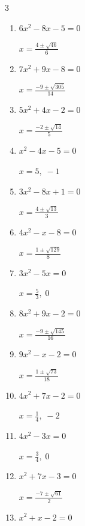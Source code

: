 \begin{multicols}{3}
\begin{enumerate}
        $\displaystyle x=\frac{-1\pm \sqrt{193}}{16}$

  \item $6x^{2}-8x-5=0$

        $\displaystyle x=\frac{4\pm \sqrt{46}}{6}$

  \item $7x^{2}+9x-8=0$

        $\displaystyle x=\frac{-9\pm \sqrt{305}}{14}$

  \item $5x^{2}+4x-2=0$

        $\displaystyle x=\frac{-2\pm \sqrt{14}}{5}$

\columnbreak %

  \item $x^{2}-4x-5=0$

        $\displaystyle x=5, \; -1$

  \item $3x^{2}-8x+1=0$

        $\displaystyle x=\frac{4\pm \sqrt{13}}{3}$

  \item $4x^{2}-x-8=0$

        $\displaystyle x=\frac{1\pm \sqrt{129}}{8}$

  \item $3x^{2}-5x=0$

        $\displaystyle x=\frac{5}{3}, \; 0$

  \item $8x^{2}+9x-2=0$

        $\displaystyle x=\frac{-9\pm \sqrt{145}}{16}$

  \item $9x^{2}-x-2=0$

        $\displaystyle x=\frac{1\pm \sqrt{73}}{18}$

  \item $4x^{2}+7x-2=0$

        $\displaystyle x=\frac{1}{4}, \; -2$

\columnbreak %

  \item $4x^{2}-3x=0$

        $\displaystyle x=\frac{3}{4}, \; 0$

  \item $x^{2}+7x-3=0$

        $\displaystyle x=\frac{-7\pm \sqrt{61}}{2}$

  \item $x^{2}+x-2=0$


\end{enumerate}
\end{multicols}
